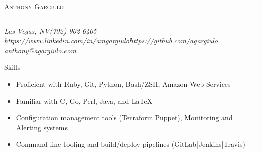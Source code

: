 \documentclass[10pt,oneside]{article}
\makeatletter
\newcommand{\name}{Anthony Gargiulo}
\newcommand{\addr}{Las Vegas, NV}
\newcommand{\mobilePhone}{(702) 902-6405}
\newcommand{\email}{anthony@agargiulo.com}
\newcommand{\github}{https://github.com/agargiulo}
\newcommand{\linkedin}{https://www.linkedin.com/in/amgargiulo}
\newcommand{\bigname}[1]{
	\begin{center}\fontfamily{bch}\selectfont\Huge\scshape#1\end{center}
}
\newenvironment{ressection}[1]{
	\vspace{2pt}
	{\fontfamily{bch}\selectfont\Large#1}
	\begin{itemize}
	\vspace{1pt}
}{
	\end{itemize}
}
\newcommand{\ressubitem}[1]{
	\vspace{-1pt}
	\item \begin{flushleft} #1 \end{flushleft}
}
\makeatother
\begin{document}
 \selectfont

\bigname{\name}

\vspace{-4pt} \rule{\textwidth}{1pt}

\vspace{-1pt} {\normalsize\itshape \addr \hfill \mobilePhone \\ \linkedin \hfill \github \\ \email}

\vspace{10 pt}



\begin{ressection}{Skills}
	\ressubitem{Proficient with Ruby, Git, Python, Bash/ZSH, Amazon Web Services}
	\ressubitem{Familiar with C, Go, Perl, Java, and \LaTeX}
	\ressubitem{Configuration management tools (Terraform|Puppet), Monitoring and Alerting systems}
	\ressubitem{Command line tooling and build/deploy pipelines (GitLab|Jenkins|Travis)}
\end{ressection}
\end{document}
